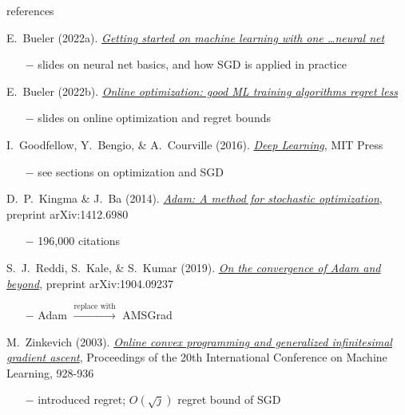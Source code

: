 \documentclass[10pt,
               svgnames,
               hyperref={colorlinks,citecolor=DeepPink4,linkcolor=FireBrick,urlcolor=Maroon},
               usepdftitle=false]{beamer}
\begin{document}
\begin{frame}{references}

\begin{itemize}
{\small
\item E.~Bueler (2022a). \href{https://bueler.github.io/M692S22/slides/bueler-intro.pdf}{\emph{Getting started on machine learning with one \dots neural net}}
    \begin{itemize}
    \scriptsize
    \item[$-$] slides on neural net basics, and how SGD is applied in practice
    \end{itemize}
\item E.~Bueler (2022b). \href{https://bueler.github.io/M692S22/slides/bueler-regret.pdf}{\emph{Online optimization: good ML training algorithms regret less}}
    \begin{itemize}
    \scriptsize
    \item[$-$] slides on online optimization and regret bounds
    \end{itemize}
\item I.~Goodfellow,  Y.~Bengio, \& A.~Courville (2016).  \href{https://mitpress.mit.edu/9780262035613/deep-learning/}{\emph{Deep Learning}}, MIT Press
    \begin{itemize}
    \scriptsize
    \item[$-$] see sections on optimization and SGD
    \end{itemize}
\item D.~P.~Kingma \& J.~Ba (2014). \href{https://arxiv.org/abs/1412.6980}{\emph{Adam: A method for stochastic optimization}}, preprint arXiv:1412.6980
    \begin{itemize}
    \scriptsize
    \item[$-$] 196,000 citations
    \end{itemize}
\item S.~J.~Reddi, S.~Kale, \& S.~Kumar (2019). \href{https://arxiv.org/abs/1904.09237}{\emph{On the convergence of Adam and beyond}}, preprint arXiv:1904.09237
    \begin{itemize}
    \scriptsize
    \item[$-$] Adam $\stackrel{\text{replace with}}{\to}$ AMSGrad
    \end{itemize}
\item M.~Zinkevich (2003). \href{https://www.aaai.org/Papers/ICML/2003/ICML03-120.pdf}{\emph{Online convex programming and generalized infinitesimal gradient ascent}}, Proceedings of the 20th International Conference on Machine Learning, 928-936
    \begin{itemize}
    \scriptsize
    \item[$-$] introduced regret; $O(\sqrt{j})$ regret bound of SGD
    \end{itemize}
}
\end{itemize}
\end{frame}
\end{document}
